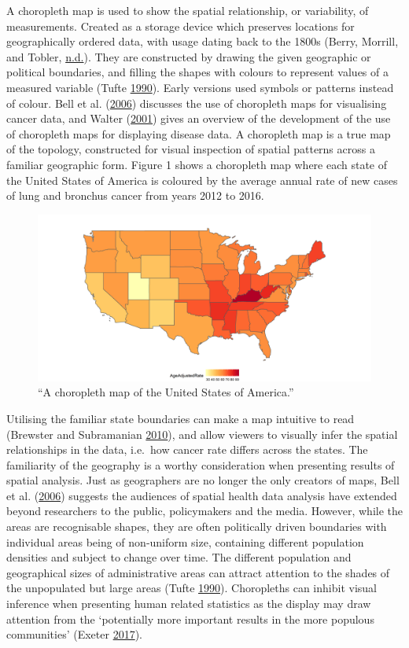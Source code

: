 \documentclass[11pt,]{article}
\begin{document}
A choropleth map is used to show the spatial relationship, or
variability, of measurements. Created as a storage device which
preserves locations for geographically ordered data, with usage dating
back to the 1800s (Berry, Morrill, and Tobler,
\protect\hyperlink{ref-GOINO}{n.d.}). They are constructed by drawing
the given geographic or political boundaries, and filling the shapes
with colours to represent values of a measured variable (Tufte
\protect\hyperlink{ref-EI}{1990}). Early versions used symbols or
patterns instead of colour. Bell et al.
(\protect\hyperlink{ref-CPISACA}{2006}) discusses the use of choropleth
maps for visualising cancer data, and Walter
(\protect\hyperlink{ref-DMAHP}{2001}) gives an overview of the
development of the use of choropleth maps for displaying disease data. A
choropleth map is a true map of the topology, constructed for visual
inspection of spatial patterns across a familiar geographic form. Figure
1 shows a choropleth map where each state of the United States of
America is coloured by the average annual rate of new cases of lung and
bronchus cancer from years 2012 to 2016.

\begin{figure}
\centering
\includegraphics{figures/ggchoro.png}
\caption{``A choropleth map of the United States of America.''}
\end{figure}

Utilising the familiar state boundaries can make a map intuitive to read
(Brewster and Subramanian \protect\hyperlink{ref-CIBMUK}{2010}), and
allow viewers to visually infer the spatial relationships in the data,
i.e.~how cancer rate differs across the states. The familiarity of the
geography is a worthy consideration when presenting results of spatial
analysis. Just as geographers are no longer the only creators of maps,
Bell et al. (\protect\hyperlink{ref-CPISACA}{2006}) suggests the
audiences of spatial health data analysis have extended beyond
researchers to the public, policymakers and the media. However, while
the areas are recognisable shapes, they are often politically driven
boundaries with individual areas being of non-uniform size, containing
different population densities and subject to change over time. The
different population and geographical sizes of administrative areas can
attract attention to the shades of the unpopulated but large areas
(Tufte \protect\hyperlink{ref-EI}{1990}). Choropleths can inhibit visual
inference when presenting human related statistics as the display may
draw attention from the `potentially more important results in the more
populous communities' (Exeter \protect\hyperlink{ref-SE}{2017}).
\end{document}
